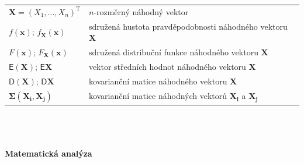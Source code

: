\documentclass[a4paper,12pt]{report}
\theoremstyle{definition} \newtheorem{definice}[veta]{Definice}
\theoremstyle{remark}
\begin{document}
   \begin{tabular}{p{4cm} p{9.3cm}}
  $\boldsymbol{X}=(X_1,\dots,X_n)^\mathrm{T}$                 &     $n$-rozměrný náhodný vektor \\
  $f(\mathbf{x})$; $f_{\boldsymbol{X}}(\mathbf{x})$                                             &   sdružená hustota pravděpodobnosti náhodného vektoru  $\boldsymbol{X}$\\
   $F(\mathbf{x})$; $F_{\boldsymbol{X}}(\mathbf{x})$                                             &   sdružená distribuční funkce náhodného vektoru  $\boldsymbol{X}$\\
    $\mathsf{E}(\boldsymbol{X})$; $\mathsf{E}\boldsymbol{X}$                             &   vektor středních hodnot náhodného vektoru $\boldsymbol{X}$\\
   $\mathsf{D}(\boldsymbol{X})$; $\mathsf{D}\boldsymbol{X}$                             &   kovarianční matice náhodného vektoru $\boldsymbol{X}$\\
    $\boldsymbol{\Sigma}(\boldsymbol{X_i},\boldsymbol{X_j})$     &   kovarianční matice náhodných vektorů $\boldsymbol{X_i}$ a $\boldsymbol{X_j}$\\
   \end{tabular}\\\\\\
%
%
%
\textbf{Matematická analýza}\\\\
\end{document}
